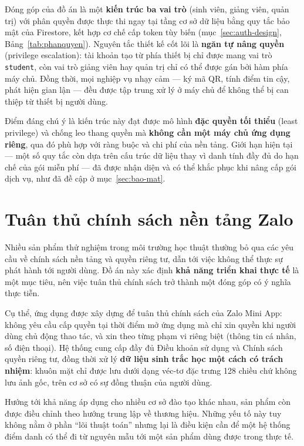 \documentclass[../main.tex]{subfiles}
\begin{document}
Đóng góp của đồ án là một \textbf{kiến trúc ba vai trò} (sinh viên, giảng viên, quản trị) với
phân quyền được thực thi ngay tại tầng cơ sở dữ liệu bằng quy tắc bảo mật của Firestore, kết
hợp cơ chế cấp token tùy biến (mục~\ref{sec:auth-design}, Bảng~\ref{tab:phanquyen}). Nguyên
tắc thiết kế cốt lõi là \textbf{ngăn tự nâng quyền} (privilege escalation): tài khoản tạo từ
phía thiết bị chỉ được mang vai trò \texttt{student}, còn vai trò giảng viên hay quản trị chỉ
có thể được gán bởi hàm phía máy chủ. Đồng thời, mọi nghiệp vụ nhạy cảm --- ký mã QR, tính
điểm tin cậy, phát hiện gian lận --- đều được tập trung xử lý ở máy chủ để không thể bị can
thiệp từ thiết bị người dùng.

Điểm đáng chú ý là kiến trúc này đạt được mô hình \textbf{đặc quyền tối thiểu} (least
privilege) và chống leo thang quyền mà \textbf{không cần một máy chủ ứng dụng riêng}, qua đó
phù hợp với ràng buộc và chi phí của nền tảng. Giới hạn hiện tại --- một số quy tắc còn dựa
trên cấu trúc dữ liệu thay vì danh tính đầy đủ do hạn chế của gói miễn phí --- đã được nhận
diện và có thể khắc phục khi nâng cấp gói dịch vụ, như đã đề cập ở mục~\ref{sec:bao-mat}.

\section{Tuân thủ chính sách nền tảng Zalo}
\label{sec:dg-zalo}

Nhiều sản phẩm thử nghiệm trong môi trường học thuật thường bỏ qua các yêu cầu về chính sách
nền tảng và quyền riêng tư, dẫn tới việc không thể thực sự phát hành tới người dùng. Đồ án này
xác định \textbf{khả năng triển khai thực tế} là một mục tiêu, nên việc tuân thủ chính sách
trở thành một đóng góp có ý nghĩa thực tiễn.

Cụ thể, ứng dụng được xây dựng để tuân thủ chính sách của Zalo Mini App: không yêu cầu cấp
quyền tại thời điểm mở ứng dụng mà chỉ xin quyền khi người dùng chủ động thao tác, và xin theo
từng phạm vi riêng biệt (thông tin cá nhân, số điện thoại). Hệ thống cung cấp đầy đủ Điều
khoản sử dụng và Chính sách quyền riêng tư, đồng thời xử lý \textbf{dữ liệu sinh trắc học một
cách có trách nhiệm}: khuôn mặt chỉ được lưu dưới dạng véc-tơ đặc trưng 128 chiều chứ không lưu
ảnh gốc, trên cơ sở có sự đồng thuận của người dùng.

Hướng tới khả năng áp dụng cho nhiều cơ sở đào tạo khác nhau, sản phẩm còn được điều chỉnh
theo hướng trung lập về thương hiệu. Những yếu tố này tuy không nằm ở phần ``lõi thuật toán''
nhưng lại là điều kiện cần để một hệ thống điểm danh có thể đi từ nguyên mẫu tới một sản phẩm
dùng được trong thực tế.
\end{document}
